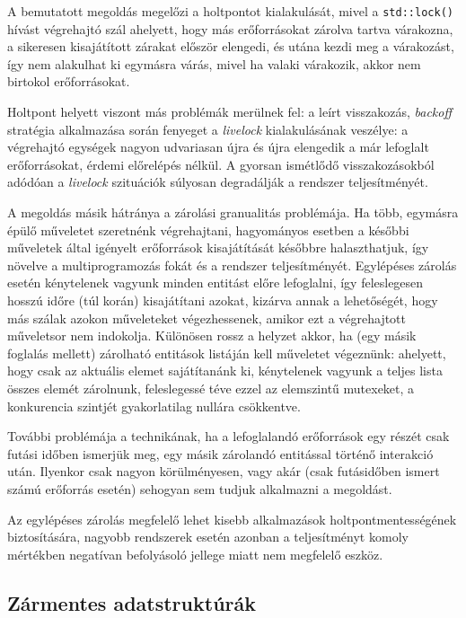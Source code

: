     A bemutatott megoldás megelőzi a holtpontot kialakulását, mivel a \texttt{std::lock()} hívást végrehajtó szál ahelyett, hogy más erőforrásokat zárolva tartva várakozna, a sikeresen kisajátított zárakat először elengedi, és utána kezdi meg a várakozást, így nem alakulhat ki egymásra várás, mivel ha valaki várakozik, akkor nem birtokol erőforrásokat.
    
    Holtpont helyett viszont más problémák merülnek fel: a leírt visszakozás, \emph{backoff} stratégia alkalmazása során fenyeget a \emph{livelock} kialakulásának veszélye: a végrehajtó egységek nagyon udvariasan újra és újra elengedik a már lefoglalt erőforrásokat, érdemi előrelépés nélkül. A gyorsan ismétlődő visszakozásokból adódóan a \emph{livelock} szituációk súlyosan degradálják a rendszer teljesítményét.
    
    A megoldás másik hátránya a zárolási granualitás problémája. Ha több, egymásra épülő műveletet szeretnénk végrehajtani, hagyományos esetben a későbbi műveletek által igényelt erőforrások kisajátítását későbbre halaszthatjuk, így növelve a multiprogramozás fokát és a rendszer teljesítményét. Egylépéses zárolás esetén kénytelenek vagyunk minden entitást előre lefoglalni, így feleslegesen hosszú időre (túl korán) kisajátítani azokat, kizárva annak a lehetőségét, hogy más szálak azokon műveleteket végezhessenek, amikor ezt a végrehajtott műveletsor nem indokolja. Különösen rossz a helyzet akkor, ha (egy másik foglalás mellett) zárolható entitások listáján kell műveletet végeznünk: ahelyett, hogy csak az aktuális elemet sajátítanánk ki, kénytelenek vagyunk a teljes lista összes elemét zárolnunk, feleslegessé téve ezzel az elemszintű mutexeket, a konkurencia szintjét gyakorlatilag nullára csökkentve.
    
    További problémája a technikának, ha a lefoglalandó erőforrások egy részét csak futási időben ismerjük meg, egy másik zárolandó entitással történő interakció után. Ilyenkor csak nagyon körülményesen, vagy akár (csak futásidőben ismert számú erőforrás esetén) sehogyan sem tudjuk alkalmazni a megoldást.
    
    Az egylépéses zárolás megfelelő lehet kisebb alkalmazások holtpontmentességének biztosítására, nagyobb rendszerek esetén azonban a teljesítményt komoly mértékben negatívan befolyásoló jellege miatt nem megfelelő eszköz.
    
    \subsection{Zármentes adatstruktúrák}
    \label{seq:lockfree}
     
